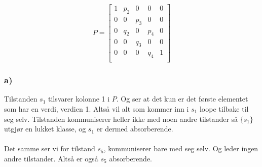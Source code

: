 \documentclass[a4paper, norsk, twoside, 10pt]{article}
\begin{document}
\begin{flushleft}
   \[P = \begin{bmatrix}
      1 & p_{2} & 0 & 0 & 0 \\
      0 & 0   & p_{3} & 0 & 0 \\
      0 & q_{2} & 0 & p_{4} & 0 \\
      0 & 0   & q_{3} & 0 & 0 \\
      0 & 0 & 0 & q_{4} & 1 \\
   \end{bmatrix}
   \]
   \subsubsection*{a)}
   Tilstanden $s_{1}$ tilsvarer kolonne 1 i $P$. Og ser at det kun er det første elementet som har en verdi, verdien 1. Altså vil alt som kommer inn i $s_{1}$ loope tilbake til seg selv. Tilstanden kommuniserer heller ikke med noen andre tilstander så $\{s_{1}\}$ utgjør en lukket klasse, og $s_{1}$ er dermed absorberende.\\
   \ \\
   Det samme ser vi for tilstand $s_{5}$, kommuniserer bare med seg selv. Og leder ingen andre tilstander. Altså er også $s_{5}$ absorberende.
  
  \end{flushleft}
\end{document}
